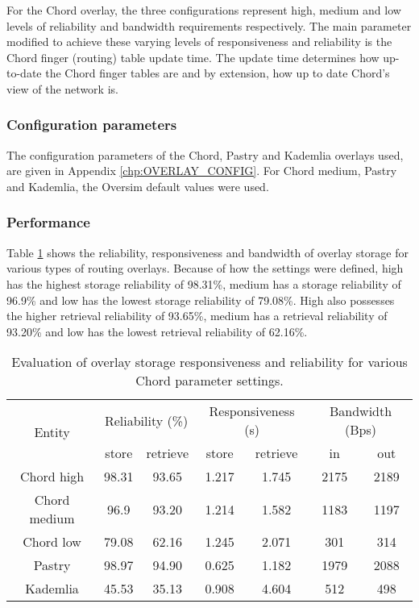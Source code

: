 For the Chord overlay, the three configurations represent high, medium and low levels of reliability and bandwidth requirements respectively. The main parameter modified to achieve these varying levels of responsiveness and reliability is the Chord finger (routing) table update time. The update time determines how up-to-date the Chord finger tables are and by extension, how up to date Chord's view of the network is.

\subsubsection{Configuration parameters}

The configuration parameters of the Chord, Pastry and Kademlia overlays used, are given in Appendix \ref{chp:OVERLAY_CONFIG}. For Chord medium, Pastry and Kademlia, the Oversim default values were used.

\subsubsection{Performance}

Table \ref{tab_overlay_rel_resp_results} shows the reliability, responsiveness and bandwidth of overlay storage for various types of routing overlays. Because of how the settings were defined, high has the highest storage reliability of 98.31\%, medium has a storage reliability of 96.9\% and low has the lowest storage reliability of 79.08\%. High also possesses the higher retrieval reliability of 93.65\%, medium has a retrieval reliability of 93.20\% and low has the lowest retrieval reliability of 62.16\%.
%
\begin{table}[htbp]
\centering
\begin{tabular}{|c|c|c|c|c|c|c|}
\hline
\multirow{2}{*}{Entity}       & \multicolumn{2}{c|}{Reliability (\%)}    &\multicolumn{2}{c|}{Responsiveness (s)}& \multicolumn{2}{c|}{Bandwidth (Bps)}\\
\cline{2-7}
             &store & retrieve & store & retrieve     & in & out\\
\hline
Chord high   & 98.31 &93.65 & 1.217&1.745  & 2175&2189 \\
Chord medium & 96.9  &93.20  & 1.214&1.582  & 1183&1197\\
Chord low    & 79.08 &62.16 & 1.245&2.071  & 301 &314\\
Pastry       & 98.97 &94.90 & 0.625&1.182  & 1979&2088\\
Kademlia     & 45.53 &35.13 & 0.908&4.604  & 512 &498\\
\hline
\end{tabular}
\caption{Evaluation of overlay storage responsiveness and reliability for various Chord parameter settings.}
\label{tab_overlay_rel_resp_results}
\end{table}

